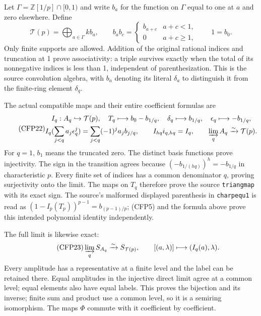 Let $\Gamma=\mathbb Z[1/p]\cap[0,1)$ and write $b_a$
for the function on $\Gamma$ equal to one at $a$
and zero elsewhere. Define
\begin{equation}\tag{CFP21}
 \mathcal T(p)=\bigoplus_{a\in\Gamma} k b_a,\qquad
 b_ab_c=\begin{cases}b_{a+c}&a+c<1,\\0&a+c\ge1,
             \end{cases}\qquad 1=b_0.
\end{equation}
Only finite supports are allowed. Addition of
the original rational indices and truncation
at 1 prove associativity: a triple survives
exactly when the total of its nonnegative
indices is less than 1, independent of
parenthesization. This is the source
convolution algebra, with $b_a$ denoting its
literal $\delta_a$ to distinguish it from
the finite-ring element $\delta_q$.

The actual compatible maps and their entire
coefficient formulas are
\begin{equation}\tag{CFP22}
\begin{gathered}
 I_q:A_q\hookrightarrow\mathcal T(p),\quad
 T_q\longmapsto b_0-b_{1/q},\quad
 \delta_q\longmapsto b_{1/q},\quad
 \epsilon_q\longmapsto-b_{1/q},\\
 I_q(\sum_{j<q}a_j\epsilon_q^j)
                  =\sum_{j<q}(-1)^j a_j b_{j/q},\qquad
 I_{hq}i_{q,hq}=I_q,\qquad
 \varinjlim_q A_q\xrightarrow{\sim}\mathcal T(p).
\end{gathered}
\end{equation}
For $q=1$, $b_1$ means the truncated zero.
The distinct basis functions prove injectivity.
The sign in the transition agrees because
$(-b_{1/(hq)})^h=-b_{1/q}$ in characteristic $p$.
Every finite set of indices has a common
denominator $q$, proving surjectivity onto
the limit. The maps on $T_q$ therefore prove
the source \texttt{triangmap} with its exact sign.
The source's malformed displayed parenthesis
in \texttt{charpequ1} is read as
$(1-I_p(T_p))^{p-1}=b_{(p-1)/p}$; (CFP5)
and the formula above prove this intended
polynomial identity independently.

The full limit is likewise exact:
\begin{equation}\tag{CFP23}
 \varinjlim_q S_{A_q}\xrightarrow{\sim}S_{\mathcal T(p)},
 \qquad[(a,\lambda)]\longmapsto(I_q(a),\lambda).
\end{equation}
Every amplitude has a representative at a
finite level and the label can be retained
there. Equal amplitudes in the injective
direct limit agree at a common level;
equal elements also have equal labels.
This proves the bijection and its inverse;
finite sum and product use a common level,
so it is a semiring isomorphism. The maps
$\Phi$ commute with it coefficient by coefficient.


